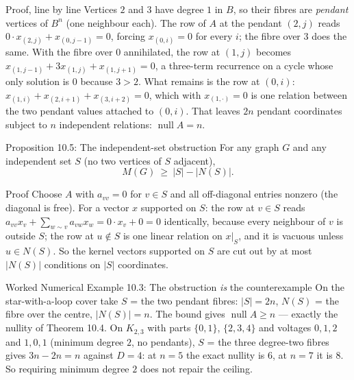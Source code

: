 \documentclass[11pt]{article}
\begin{document}
\begin{defbox}{Proof, line by line}
Vertices $2$ and $3$ have degree $1$ in $B$, so their fibres are \emph{pendant} vertices of $B^n$ (one neighbour each). The row of $A$ at the pendant $(2,j)$ reads $0\cdot x_{(2,j)}+x_{(0,j-1)}=0$, forcing $x_{(0,i)}=0$ for every $i$; the fibre over $3$ does the same. With the fibre over $0$ annihilated, the row at $(1,j)$ becomes $x_{(1,j-1)}+3x_{(1,j)}+x_{(1,j+1)}=0$, a three-term recurrence on a cycle whose only solution is $0$ because $3>2$. What remains is the row at $(0,i)$: $x_{(1,i)}+x_{(2,i+1)}+x_{(3,i+2)}=0$, which with $x_{(1,\cdot)}=0$ is one relation between the two pendant values attached to $(0,i)$. That leaves $2n$ pendant coordinates subject to $n$ independent relations: $\operatorname{null}A=n$. \qedhere
\end{defbox}

\begin{thmbox}{Proposition 10.5: The independent-set obstruction}
For any graph $G$ and any independent set $S$ (no two vertices of $S$ adjacent),
\begin{equation}
  M(G)\ \ge\ |S|-|N(S)| .
\end{equation}
\end{thmbox}

\begin{defbox}{Proof}
Choose $A$ with $a_{vv}=0$ for $v\in S$ and all off-diagonal entries nonzero (the diagonal is free). For a vector $x$ supported on $S$: the row at $v\in S$ reads $a_{vv}x_v+\sum_{w\sim v}a_{vw}x_w=0\cdot x_v+0=0$ identically, because every neighbour of $v$ is outside $S$; the row at $u\notin S$ is one linear relation on $x|_S$, and it is vacuous unless $u\in N(S)$. So the kernel vectors supported on $S$ are cut out by at most $|N(S)|$ conditions on $|S|$ coordinates. \qedhere
\end{defbox}

\begin{callbox}{Worked Numerical Example 10.3: The obstruction \emph{is} the counterexample}
On the star-with-a-loop cover take $S$ = the two pendant fibres: $|S|=2n$, $N(S)$ = the fibre over the centre, $|N(S)|=n$. The bound gives $\operatorname{null}A\ge n$ --- exactly the nullity of Theorem 10.4. On $K_{2,3}$ with parts $\{0,1\}$, $\{2,3,4\}$ and voltages $0,1,2$ and $1,0,1$ (minimum degree $2$, no pendants), $S$ = the three degree-two fibres gives $3n-2n=n$ against $D=4$: at $n=5$ the exact nullity is $6$, at $n=7$ it is $8$. So requiring minimum degree $2$ does not repair the ceiling.
\end{callbox}
\end{document}
